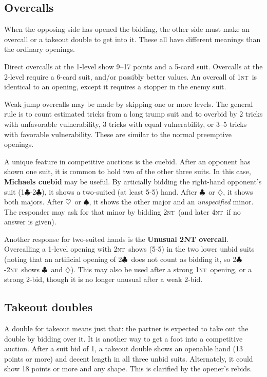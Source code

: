 \documentclass[11pt]{article}
\def\C{$\clubsuit$}
\def\D{$\diamondsuit$}
\def\H{$\heartsuit$}
\def\S{$\spadesuit$}
\def\NT{\textsc{nt}}
\begin{document}
\subsection{Overcalls}
When the opposing side has opened the bidding, the other side
must make an overcall or a takeout double to get into it.  These
all have different meanings than the ordinary openings.

Direct overcalls at the 1-level show 9--17 points and a 5-card suit.
Overcalls at the 2-level require a 6-card suit, and/or possibly better
values.  An overcall of 1\NT\ is identical to an opening, except it
requires a stopper in the enemy suit.

Weak jump overcalls may be made by skipping one or more levels.
The general rule is to count estimated tricks from a long trump
suit and to overbid by 2 tricks with unfavorable vulnerability,
3 tricks with equal vulnerability, or 3--5 tricks with
favorable vulnerability.  These are similar to the normal
preemptive openings.

A unique feature in competitive auctions is the cuebid.  After an
opponent has shown one suit, it is common to hold two of the
other three suits.  In this case, \textbf{Michaels cuebid} may be useful.
By articially bidding the right-hand opponent's suit (1\C-2\C),
it shows a two-suited (at least 5-5) hand.  After \C\ or \D,
it shows both majors.  After \H\ or \S, it shows the other
major and an \emph{unspecified} minor.  The responder may ask
for that minor by bidding 2\NT\ (and later 4\NT\ if no answer is
given).

Another response for two-suited hands is the \textbf{Unusual 2NT overcall}.
Overcalling a 1-level opening with 2\NT\ shows (5-5) in the two lower unbid
suits (noting that an artificial opening of 2\C\ does not count as bidding
it, so 2\C-2\NT\ shows \C\ and \D).  This may also be used after a strong 
1\NT\ opening, or a strong 2-bid, though it is no longer unusual after a
weak 2-bid.

\subsection{Takeout doubles}

A double for takeout means just that: the partner is expected to
take out the double by bidding over it.  It is another way to get
a foot into a competitive auction.  After a suit bid of 1, a takeout
double shows an openable hand (13 points or more) and decent length
in all three unbid suits.  Alternately, it could show 18 points or more
and any shape.  This is clarified by the opener's rebids.
\end{document}
